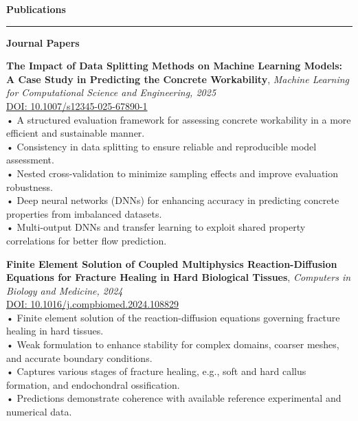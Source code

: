 \documentclass[11pt]{article}  %
\newenvironment{rSection}[1]{  %
    \vspace{0.5em}  %
    {\Large\bfseries\color{primary} #1}  %
    \vspace{0.3em}  %
    {\color{primary}\hrule height 2pt}  %
    \vspace{0.3em}  %
}{
    \vspace{0.05em}  %
}
\begin{document}
\begin{rSection}{Publications}
    \vspace{0.3em}
    
    {\color{primary}\textbf{Journal Papers}\par}
    \vspace{0.3em}
    
    \noindent\begin{minipage}{\textwidth}
        \textbf{The Impact of Data Splitting Methods on Machine Learning Models: A Case Study in Predicting the Concrete Workability}, \textit{\color{lighttext}Machine Learning for Computational Science and Engineering, 2025}\\[0.3em]
        \href{https://doi.org/10.1007/s12345-025-67890-1}{\small\color{primary}DOI: 10.1007/s12345-025-67890-1}\\[0.3em]
        \small\color{lighttext}    • A structured evaluation framework for assessing concrete workability in a more efficient and sustainable manner.\\
        \small\color{lighttext}    • Consistency in data splitting to ensure reliable and reproducible model assessment.\\
        \small\color{lighttext}    • Nested cross-validation to minimize sampling effects and improve evaluation robustness.\\
        \small\color{lighttext}    • Deep neural networks (DNNs) for enhancing accuracy in predicting concrete properties from imbalanced datasets.\\
        \small\color{lighttext}    • Multi-output DNNs and transfer learning to exploit shared property correlations for better flow prediction.\\
        \end{minipage}
    
    \noindent\begin{minipage}{\textwidth}
        \textbf{Finite Element Solution of Coupled Multiphysics Reaction-Diffusion Equations for Fracture Healing in Hard Biological Tissues}, \textit{\color{lighttext}Computers in Biology and Medicine, 2024}\\[0.3em]
        \href{https://doi.org/10.1016/j.compbiomed.2024.108829}{\small\color{primary}DOI: 10.1016/j.compbiomed.2024.108829}\\[0.3em]
        \small\color{lighttext}    • Finite element solution of the reaction-diffusion equations governing fracture healing in hard tissues.\\
        \small\color{lighttext}    • Weak formulation to enhance stability for complex domains, coarser meshes, and accurate boundary conditions.\\
        \small\color{lighttext}    • Captures various stages of fracture healing, e.g., soft and hard callus formation, and endochondral ossification.\\
        \small\color{lighttext}    • Predictions demonstrate coherence with available reference experimental and numerical data.\\
        \end{minipage}
    

\end{rSection}
\end{document}

